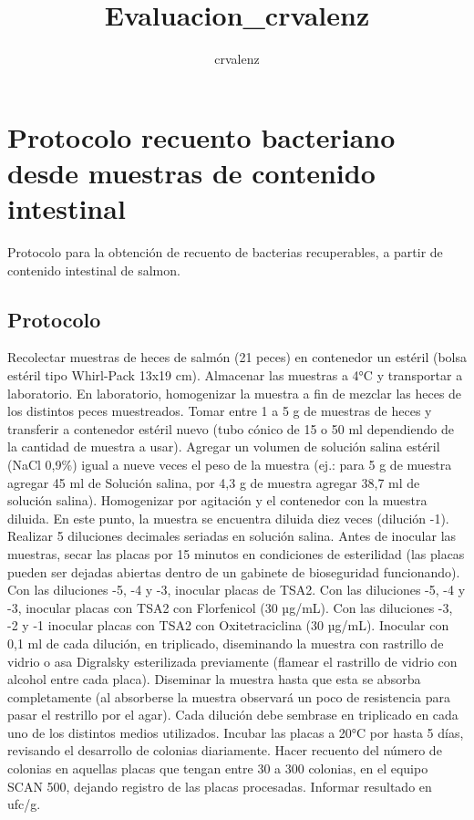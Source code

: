 \documentclass[
  letterpaper,
  DIV=11,
  numbers=noendperiod]{scrartcl}
\title{Evaluacion\_crvalenz}
\author{crvalenz}
\date{}
\begin{document}
\maketitle
\ifdefined\Shaded\renewenvironment{Shaded}{\begin{tcolorbox}[boxrule=0pt, sharp corners, frame hidden, enhanced, borderline west={3pt}{0pt}{shadecolor}, interior hidden, breakable]}{\end{tcolorbox}}\fi

\hypertarget{protocolo-recuento-bacteriano-desde-muestras-de-contenido-intestinal}{%
\section{Protocolo recuento bacteriano desde muestras de contenido
intestinal}\label{protocolo-recuento-bacteriano-desde-muestras-de-contenido-intestinal}}

Protocolo para la obtención de recuento de bacterias recuperables, a
partir de contenido intestinal de salmon.

\hypertarget{protocolo}{%
\subsection{Protocolo}\label{protocolo}}

Recolectar muestras de heces de salmón (21 peces) en contenedor un
estéril (bolsa estéril tipo Whirl-Pack 13x19 cm). Almacenar las muestras
a 4°C y transportar a laboratorio. En laboratorio, homogenizar la
muestra a fin de mezclar las heces de los distintos peces muestreados.
Tomar entre 1 a 5 g de muestras de heces y transferir a contenedor
estéril nuevo (tubo cónico de 15 o 50 ml dependiendo de la cantidad de
muestra a usar). Agregar un volumen de solución salina estéril (NaCl
0,9\%) igual a nueve veces el peso de la muestra (ej.: para 5 g de
muestra agregar 45 ml de Solución salina, por 4,3 g de muestra agregar
38,7 ml de solución salina). Homogenizar por agitación y el contenedor
con la muestra diluida. En este punto, la muestra se encuentra diluida
diez veces (dilución -1). Realizar 5 diluciones decimales seriadas en
solución salina. Antes de inocular las muestras, secar las placas por 15
minutos en condiciones de esterilidad (las placas pueden ser dejadas
abiertas dentro de un gabinete de bioseguridad funcionando). Con las
diluciones -5, -4 y -3, inocular placas de TSA2. Con las diluciones -5,
-4 y -3, inocular placas con TSA2 con Florfenicol (30 µg/mL). Con las
diluciones -3, -2 y -1 inocular placas con TSA2 con Oxitetraciclina (30
µg/mL). Inocular con 0,1 ml de cada dilución, en triplicado, diseminando
la muestra con rastrillo de vidrio o asa Digralsky esterilizada
previamente (flamear el rastrillo de vidrio con alcohol entre cada
placa). Diseminar la muestra hasta que esta se absorba completamente (al
absorberse la muestra observará un poco de resistencia para pasar el
restrillo por el agar). Cada dilución debe sembrase en triplicado en
cada uno de los distintos medios utilizados. Incubar las placas a 20°C
por hasta 5 días, revisando el desarrollo de colonias diariamente. Hacer
recuento del número de colonias en aquellas placas que tengan entre 30 a
300 colonias, en el equipo SCAN 500, dejando registro de las placas
procesadas. Informar resultado en ufc/g.
\end{document}
